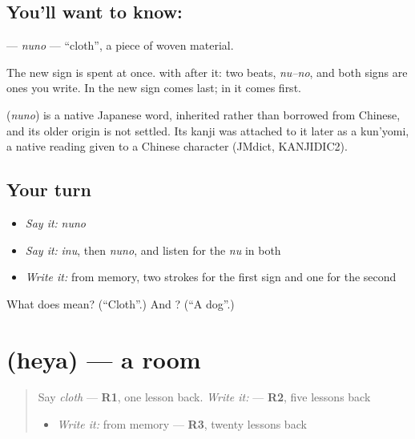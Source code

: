 \subsection*{You'll want to know: }
\textbf{} — \emph{nuno} — \textquotedblleft{}cloth\textquotedblright{}, a piece of woven material.

The new sign is spent at once. \textbf{} with \textbf{} after it: two beats, \emph{nu–no}, and both signs are ones you write. In \textbf{} the new sign comes last; in \textbf{} it comes first.

\begin{cousinweb}
\textbf{} (\emph{nuno}) is a native Japanese word, inherited rather than borrowed from Chinese, and its older origin is not settled. Its kanji was attached to it later as a kun'yomi, a native reading given to a Chinese character (JMdict, KANJIDIC2).
\end{cousinweb}

\subsection*{Your turn}
\begin{itemize}
\raggedright
  \item \emph{Say it:} \emph{nuno}
  \item \emph{Say it:} \emph{inu}, then \emph{nuno}, and listen for the \emph{nu} in both
  \item \emph{Write it:} \textbf{} from memory, two strokes for the first sign and one for the second
\end{itemize}

\begin{tcolorbox}[breakable,colback=teal!4,colframe=teal!35!black,title={Before you move on}]
What does  mean? (\textquotedblleft{}Cloth\textquotedblright{}.) And ? (\textquotedblleft{}A dog\textquotedblright{}.)
\end{tcolorbox}
\section[\texorpdfstring{\ja{へや} (heya)}{へや (heya)}]{ (heya) — a room}

\label{lesson:JA-C133-heya}



\begin{quote}
Say \emph{cloth} — \textbf{R1}, one lesson back. \emph{Write it:} \textbf{} — \textbf{R2}, five lessons back

\begin{itemize}
\raggedright
  \item \emph{Write it:} \textbf{} from memory — \textbf{R3}, twenty lessons back
\end{itemize}
\end{quote}


